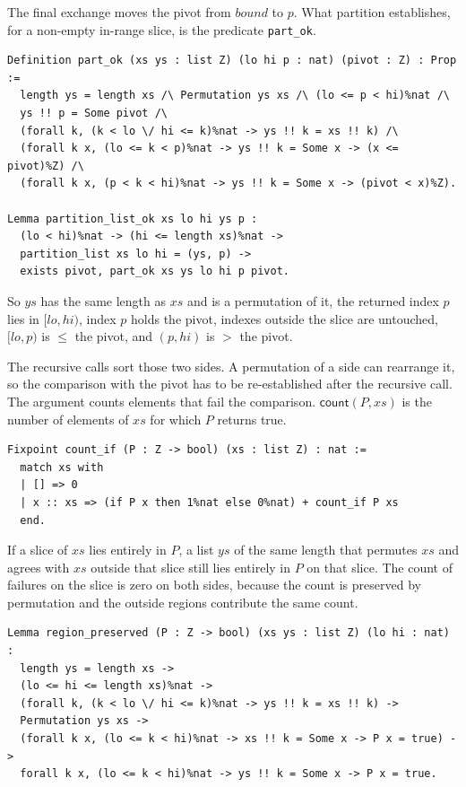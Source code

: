 \documentclass[11pt]{article}
\begin{document}
The final exchange moves the pivot from \(\mathit{bound}\) to \(p\).
What partition establishes, for a non-empty in-range slice, is the predicate \texttt{part\_ok}.

\begin{lstlisting}
Definition part_ok (xs ys : list Z) (lo hi p : nat) (pivot : Z) : Prop :=
  length ys = length xs /\ Permutation ys xs /\ (lo <= p < hi)%nat /\
  ys !! p = Some pivot /\
  (forall k, (k < lo \/ hi <= k)%nat -> ys !! k = xs !! k) /\
  (forall k x, (lo <= k < p)%nat -> ys !! k = Some x -> (x <= pivot)%Z) /\
  (forall k x, (p < k < hi)%nat -> ys !! k = Some x -> (pivot < x)%Z).

Lemma partition_list_ok xs lo hi ys p :
  (lo < hi)%nat -> (hi <= length xs)%nat ->
  partition_list xs lo hi = (ys, p) ->
  exists pivot, part_ok xs ys lo hi p pivot.
\end{lstlisting}

So \(ys\) has the same length as \(xs\) and is a permutation of it, the returned index \(p\) lies in \([lo, hi)\), index \(p\) holds the pivot, indexes outside the slice are untouched, \([lo, p)\) is \(\le\) the pivot, and \((p, hi)\) is \(>\) the pivot.

The recursive calls sort those two sides.
A permutation of a side can rearrange it, so the comparison with the pivot has to be re-established after the recursive call.
The argument counts elements that fail the comparison.
\(\mathsf{count}(P, xs)\) is the number of elements of \(xs\) for which \(P\) returns true.

\begin{lstlisting}
Fixpoint count_if (P : Z -> bool) (xs : list Z) : nat :=
  match xs with
  | [] => 0
  | x :: xs => (if P x then 1%nat else 0%nat) + count_if P xs
  end.
\end{lstlisting}

If a slice of \(xs\) lies entirely in \(P\), a list \(ys\) of the same length that permutes \(xs\) and agrees with \(xs\) outside that slice still lies entirely in \(P\) on that slice.
The count of failures on the slice is zero on both sides, because the count is preserved by permutation and the outside regions contribute the same count.

\begin{lstlisting}
Lemma region_preserved (P : Z -> bool) (xs ys : list Z) (lo hi : nat) :
  length ys = length xs ->
  (lo <= hi <= length xs)%nat ->
  (forall k, (k < lo \/ hi <= k)%nat -> ys !! k = xs !! k) ->
  Permutation ys xs ->
  (forall k x, (lo <= k < hi)%nat -> xs !! k = Some x -> P x = true) ->
  forall k x, (lo <= k < hi)%nat -> ys !! k = Some x -> P x = true.
\end{lstlisting}
\end{document}
